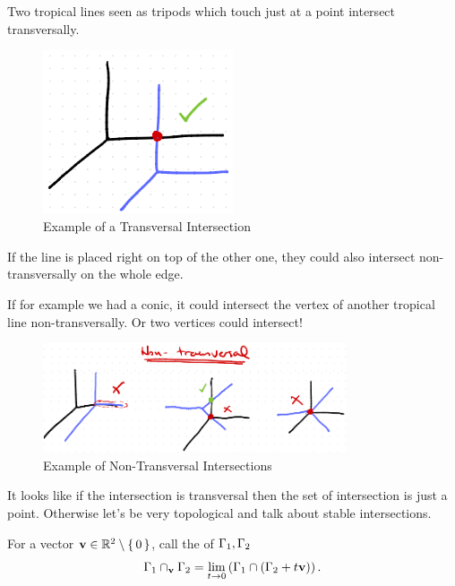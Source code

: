 \documentclass[12pt]{memoir}
\theoremstyle{definition}
\begin{document}
\begin{Ex}
    Two tropical lines seen as tripods which touch just at a point intersect transversally. 
    \begin{figure}[h!]
        \centering
        \includegraphics[width=0.5\textwidth]{figs/fig11-1-TransversalIntersectionExample.png}
        \caption{Example of a Transversal Intersection}
        \label{fig:11.1-TransversalIntersectionExample}
    \end{figure}
\end{Ex}

\begin{Ex}
    If the line is placed right on top of the other one, they could also intersect non-transversally on the whole edge.\par 
    If for example we had a conic, it could intersect the vertex of another tropical line non-transversally. Or two vertices could intersect!
    \begin{figure}[h!]
        \centering
        \includegraphics[width=0.8\textwidth]{figs/fig11-2-NonTransversalIntersectionExample.png}
        \caption{Example of Non-Transversal Intersections}
        \label{fig:11.2-NonTransversalIntersectionExample}
    \end{figure}
\end{Ex}

It looks like if the intersection is transversal then the set of intersection is just a point. Otherwise let's be very topological and talk about stable intersections.

\begin{Def}
    For a vector $\mathbf{v}\in\mathbb{R}^2\setminus\{\,0\,\}$, call the  of $\Gamma_1,\Gamma_2$
    $$\Gamma_1\cap_{\mathbf{v}}\Gamma_2=\lim_{t\to 0}\left(\Gamma_1\cap(\Gamma_2+t\mathbf{v})\right).$$
\end{Def}
\end{document}

